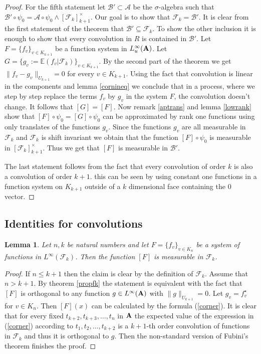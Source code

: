 \documentclass [11pt] {article}
\newtheorem{lemma}{Lemma}[section]
\def\con{\star}
\def\bA{{\bf A}}
\begin{document}
\begin{proof}
For the fifth statement let $\mathcal{B}'\subset\mathcal{A}$ be the $\sigma$-algebra such that $\mathcal{B}'\circ\psi_0=\mathcal{A}\circ\psi_0\wedge[\mathcal{F}_k]_{k+1}^\times$. Our goal is to show that $\mathcal{F}_k=\mathcal{B}'$. It is clear from the first statement of the theorem that $\mathcal{B}'\subseteq\mathcal{F}_k$. To show the other inclusion it is enough to show that every convolution in $R$ is contained in $\mathcal{B}'$. Let $F=\{f_v\}_{v\in K_{k+1}}$ be a function system in $L^\infty_u(\bA)$. Let $G=\{g_v:=\mathbb{E}(f_v|\mathcal{F}_k)\}_{v\in K_{k+1}}$. By the second part of the theorem we get $\|f_v-g_v\|_{U_{k+1}}=0$ for every $v\in K_{k+1}$. Using the fact that convolution is linear in the components and lemma \ref{cornineq} we conclude that in a process, where we step by step replace the terms $f_v$ by $g_v$ in the system $F$, the convolution doesn't change. It follows that $[G]=[F]$. Now remark \ref{aptrans} and lemma \ref{lowrank} show that $[F]\circ\psi_0=[G]\circ\psi_0$ can be approximated by rank one functions using only translates of the functions $g_v$. Since the functions $g_v$ are all measurable in $\mathcal{F}_k$ and $\mathcal{F}_k$ is shift invariant we obtain that the function $[F]\circ\psi_0$ is measurable in $[\mathcal{F}_k]_{k+1}^\times$. Thus we get that $[F]$ is measurable in $\mathcal{B}'$. 

The last statement follows from the fact that every convolution of order $k$ is also a convolution of order $k+1$. this can be seen by using constant one functions in a function system on $K_{k+1}$ outside of a $k$ dimensional face containing the $0$ vector.
\end{proof}


\subsection{Identities for convolutions}

\begin{lemma}\label{fkconvfk} Let $n,k$ be natural numbers and let $F=\{f_v\}_{v\in K_n}$ be a system of functions in $L^\infty(\mathcal{F}_k)$. Then the function $[F]$ is measurable in $\mathcal{F}_k$.
\end{lemma}

\begin{proof} If $n\leq k+1$ then the claim is clear by the definition of $\mathcal{F}_k$. Assume that $n>k+1$. By theorem \ref{propfk} the statement is equivalent with the fact that $[F]$ is orthogonal to any function $g\in L^\infty(\bA)$ with $\|g\|_{U_{k+1}}=0$. Let $g_v=f_v^\con$ for $v\in K_n$. Then $[F](x)$ can be calculated by the formula (\ref{corner}). It is clear that for every fixed $t_{k+2},t_{k+3},\dots,t_n$ in $\bA$ the expected value of the expression in (\ref{corner}) according to $t_1,t_2,\dots,t_{k+2}$ is a $k+1$-th order convolution of functions in $\mathcal{F}_k$ and thus it is orthogonal to $g$. Then the non-standard version of Fubini's theorem \cite{ESz} finishes the proof.
\end{proof}
\end{document}
